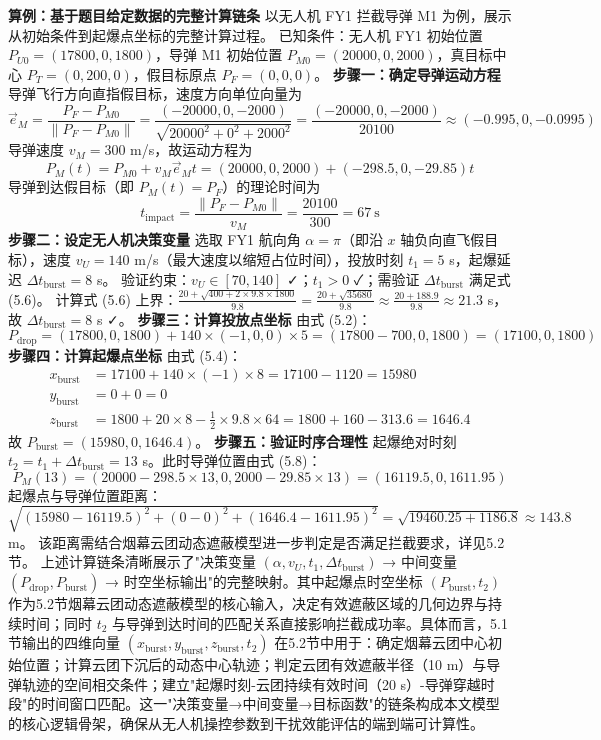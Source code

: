 \documentclass{JXUSTmodeling}
\begin{document}
\textbf{算例：基于题目给定数据的完整计算链条}
以无人机 FY1 拦截导弹 M1 为例，展示从初始条件到起爆点坐标的完整计算过程。
已知条件：无人机 FY1 初始位置 $P_{U0}=(17800, 0, 1800)$，导弹 M1 初始位置 $P_{M0}=(20000, 0, 2000)$，真目标中心 $P_T=(0, 200, 0)$，假目标原点 $P_F=(0,0,0)$。
\textbf{步骤一：确定导弹运动方程}
导弹飞行方向直指假目标，速度方向单位向量为
$$\vec{e}_M=\frac{P_F-P_{M0}}{\|P_F-P_{M0}\|}=\frac{(-20000, 0, -2000)}{\sqrt{20000^2+0^2+2000^2}}=\frac{(-20000, 0, -2000)}{20100}\approx(-0.995, 0, -0.0995)$$
导弹速度 $v_M=300$ m/s，故运动方程为
\begin{equation}
P_M(t)=P_{M0}+v_M\vec{e}_M t=(20000, 0, 2000)+(-298.5, 0, -29.85)t \tag{5.8}
\end{equation}
导弹到达假目标（即 $P_M(t)=P_F$）的理论时间为
$$t_{\text{impact}}=\frac{\|P_F-P_{M0}\|}{v_M}=\frac{20100}{300}=67\ \text{s}$$
\textbf{步骤二：设定无人机决策变量}
选取 FY1 航向角 $\alpha=\pi$（即沿 $x$ 轴负向直飞假目标），速度 $v_U=140$ m/s（最大速度以缩短占位时间），投放时刻 $t_1=5$ s，起爆延迟 $\Delta t_{\text{burst}}=8$ s。
验证约束：$v_U\in[70,140]$ ✓；$t_1>0$ ✓；需验证 $\Delta t_{\text{burst}}$ 满足式 (5.6)。
计算式 (5.6) 上界：$\frac{20+\sqrt{400+2\times9.8\times1800}}{9.8}=\frac{20+\sqrt{35680}}{9.8}\approx\frac{20+188.9}{9.8}\approx21.3$ s，故 $\Delta t_{\text{burst}}=8$ s ✓。
\textbf{步骤三：计算投放点坐标}
由式 (5.2)：
$$P_{\text{drop}}=(17800, 0, 1800)+140\times(-1, 0, 0)\times 5=(17800-700, 0, 1800)=(17100, 0, 1800)$$
\textbf{步骤四：计算起爆点坐标}
由式 (5.4)：
$$\begin{aligned}
x_{\text{burst}}&=17100+140\times(-1)\times 8=17100-1120=15980\\
y_{\text{burst}}&=0+0=0\\
z_{\text{burst}}&=1800+20\times 8-\frac{1}{2}\times9.8\times64=1800+160-313.6=1646.4
\end{aligned}$$
故 $P_{\text{burst}}=(15980, 0, 1646.4)$。
\textbf{步骤五：验证时序合理性}
起爆绝对时刻 $t_2=t_1+\Delta t_{\text{burst}}=13$ s。此时导弹位置由式 (5.8)：
$$P_M(13)=(20000-298.5\times13, 0, 2000-29.85\times13)=(16119.5, 0, 1611.95)$$
起爆点与导弹位置距离：$\sqrt{(15980-16119.5)^2+(0-0)^2+(1646.4-1611.95)^2}=\sqrt{19460.25+1186.8}\approx143.8$ m。
该距离需结合烟幕云团动态遮蔽模型进一步判定是否满足拦截要求，详见5.2节。
上述计算链条清晰展示了"决策变量 $(\alpha, v_U, t_1, \Delta t_{\text{burst}})$ → 中间变量 $(P_{\text{drop}}, P_{\text{burst}})$ → 时空坐标输出"的完整映射。其中起爆点时空坐标 $(P_{\text{burst}}, t_2)$ 作为5.2节烟幕云团动态遮蔽模型的核心输入，决定有效遮蔽区域的几何边界与持续时间；同时 $t_2$ 与导弹到达时间的匹配关系直接影响拦截成功率。具体而言，5.1节输出的四维向量 $(x_{\text{burst}}, y_{\text{burst}}, z_{\text{burst}}, t_2)$ 在5.2节中用于：确定烟幕云团中心初始位置；计算云团下沉后的动态中心轨迹；判定云团有效遮蔽半径（10 m）与导弹轨迹的空间相交条件；建立"起爆时刻-云团持续有效时间（20 s）-导弹穿越时段"的时间窗口匹配。这一"决策变量→中间变量→目标函数"的链条构成本文模型的核心逻辑骨架，确保从无人机操控参数到干扰效能评估的端到端可计算性。
\end{document}
